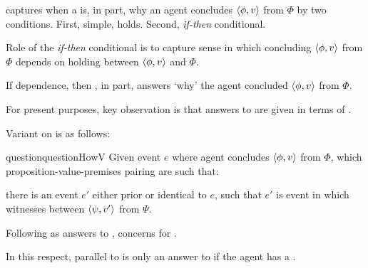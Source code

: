 \begin{note}
  \qWhyV{} captures when a \ros{} is, in part, why an agent concludes \(\langle \phi, v \rangle\) from \(\Phi\) by two conditions.
  First, simple, \ros{} holds.
  Second, \emph{if-then} conditional.

  Role of the \emph{if-then} conditional is to capture sense in which concluding \(\langle \phi, v \rangle\) from \(\Phi\) depends on \ros{} holding between \(\langle \phi, v \rangle\) and \(\Phi\).

  If dependence, then \ros{}, in part, answers `why' the agent concluded \(\langle \phi, v \rangle\) from \(\Phi\).

  For present purposes, key observation is that answers to \qWhyV{} are given in terms of .
\end{note}

\begin{note}
  Variant on \qHow{} is as follows:

  \begin{restatable}[\qHowV{}]{question}{questionHowV}
    \label{q:how:v}
    Given event \(e\) where agent concludes \(\langle \phi, v \rangle\) from \(\Phi\), which proposition-value-premises pairing are such that:

    there is an event \(e'\) either prior or identical to \(e\), such that \(e'\) is event in which \vAgent{} witnesses \support{} between \(\langle \psi, v' \rangle\) from \(\Psi\).
  \end{restatable}

  Following  as answers to \qWhyV{}, \qHowV{} concerns  for .

  In this respect, parallel to \issueInclusion{}
  \ros{} is only an answer to \qWhyV{} if the agent has a \witness{}.
\end{note}

